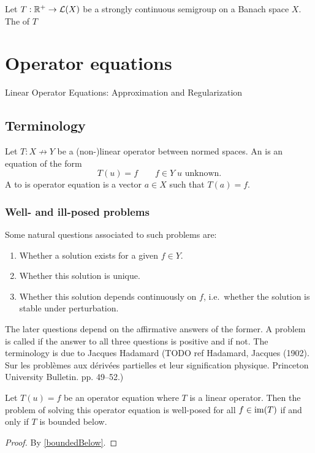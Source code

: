 \begin{definition}
Let $T: \mathbb{R}^+\to \operatorname{\mathcal{L}}(X)$ be a strongly continuous semigroup on a Banach space $X$. The  of $T$
\end{definition}

\chapter{Operator equations}
Linear Operator Equations: Approximation and Regularization
\section{Terminology}
\begin{definition}
Let $T: X\not\to Y$ be a (non-)linear operator between normed spaces. An  is an equation of the form
\[ T(u) = f \qquad f\in Y\; \text{$u$ unknown.} \]
A  to is operator equation is a vector $a\in X$ such that $T(a) = f$.
\end{definition}
\subsection{Well- and ill-posed problems}
Some natural questions associated to such problems are:
\begin{enumerate}
\item Whether a solution exists for a given $f\in Y$.
\item Whether this solution is unique.
\item Whether this solution depends continuously on $f$, i.e.\ whether the solution is stable under perturbation.
\end{enumerate}
The later questions depend on the affirmative answers of the former. A problem is called  if the answer to all three questions is positive and  if not. The terminology is due to Jacques Hadamard (TODO ref Hadamard, Jacques (1902). Sur les problèmes aux dérivées partielles et leur signification physique. Princeton University Bulletin. pp. 49–52.)

\begin{proposition}
Let $ T(u) = f$ be an operator equation where $T$ is a linear operator. Then the problem of solving this operator equation is well-posed for all $f\in\operatorname{im}(T)$ \textup{if and only if} $T$ is bounded below.
\end{proposition}
\begin{proof}
By \ref{boundedBelow}.
\end{proof}

